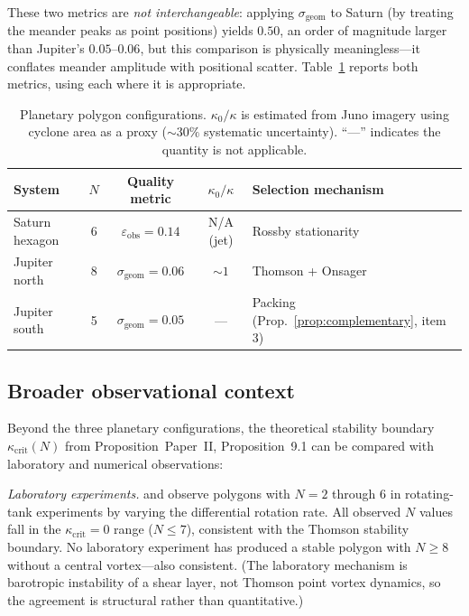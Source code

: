 These two metrics are \emph{not interchangeable}: applying
$\sigma_{\mathrm{geom}}$ to Saturn (by treating the meander peaks as
point positions) yields $0.50$, an order of magnitude larger than
Jupiter's $0.05$--$0.06$, but this comparison is physically
meaningless---it conflates meander amplitude with positional scatter.
Table~\ref{tab:planets} reports both metrics, using each where it is
appropriate.

\begin{table}[htbp]
\centering
\caption{Planetary polygon configurations.
$\kappa_0/\kappa$ is estimated from Juno imagery \citep{Adriani2018}
using cyclone area as a proxy ($\sim\!30\%$ systematic uncertainty).
``---'' indicates the quantity is not applicable.}
\label{tab:planets}
\begin{tabular}{lcccl}
\toprule
System & $N$ & Quality metric &
  $\kappa_0/\kappa$ & Selection mechanism \\
\midrule
Saturn hexagon    & 6 & $\varepsilon_{\mathrm{obs}} = 0.14$ & N/A (jet) & Rossby stationarity \\
Jupiter north     & 8 & $\sigma_{\mathrm{geom}} = 0.06$ & $\sim\!1$ & Thomson + Onsager \\
Jupiter south     & 5 & $\sigma_{\mathrm{geom}} = 0.05$ & --- & Packing (Prop.~\ref{prop:complementary}, item 3) \\
\bottomrule
\end{tabular}
\end{table}

\subsection{Broader observational context}

Beyond the three planetary configurations, the theoretical stability
boundary $\kappa_{\mathrm{crit}}(N)$ from
Proposition~Paper~II, Proposition~9.1 can be compared with laboratory and
numerical observations:

\emph{Laboratory experiments.}  \citet{Jansson2006} and
\citet{BarbosaAguiar2010} observe polygons with $N = 2$ through $6$
in rotating-tank experiments by varying the differential rotation rate.
All observed $N$ values fall in the $\kappa_{\mathrm{crit}} = 0$ range
($N \le 7$), consistent with the Thomson stability boundary.  No
laboratory experiment has produced a stable polygon with $N \ge 8$
without a central vortex---also consistent.  (The laboratory mechanism
is barotropic instability of a shear layer, not Thomson point vortex
dynamics, so the agreement is structural rather than quantitative.)

